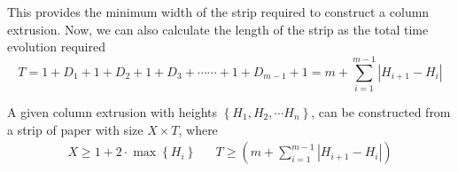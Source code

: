 This provides the minimum width of the strip required to construct a column extrusion.
Now, we can also calculate the length of the strip as the total time evolution required
$$ T = 1 + D_1  +  1 + D_2  +  1 + D_3  +\cdots\cdots +  1 + D_{m-1}  +  1 = m + \sum^{m-1}_{i=1} \left| H_{i+1}-H_i\right| $$

\begin{theorem}
\label{thm:column_extrusion}
A given column extrusion with heights $\left\{ H_1, H_2,\cdots H_n \right\}$, can be constructed from a strip of paper with size
$X\times T$, where
\begin{align}
X\ge 1 + 2\cdot\max\left\{ H_i\right\} && T \ge \left( m + \sum\limits^{m-1}_{i=1} \left| H_{i+1}-H_i\right|\right)
\end{align}
\end{theorem}



